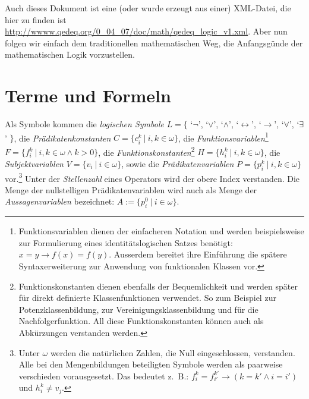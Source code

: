 \documentclass[a4paper,german,10pt,twoside]{book}
\theoremstyle{definition}
\theoremstyle{remark}
\begin{document}
\par
Auch dieses Dokument ist eine (oder wurde erzeugt aus einer) XML-Datei, die hier zu finden ist \url{http://wwww.qedeq.org/0_04_07/doc/math/qedeq_logic_v1.xml}.
Aber nun folgen wir einfach dem traditionellen mathematischen Weg, die Anfangsg{\"u}nde der mathematischen Logik vorzustellen.

\section{Terme und Formeln} \label{chapter4_section1} \hypertarget{chapter4_section1}{}
Als Symbole kommen die \emph{logischen Symbole} $L = \{$ \mbox{`$\neg$'}, \mbox{`$\vee$'}, \mbox{`$\wedge$'},             \mbox{`$\leftrightarrow$'}, \mbox{`$\rightarrow$'}, \mbox{`$\forall$'}, \mbox{`$\exists$'} $\}$, die 
\emph{Pr{\"a}dikatenkonstanten} $C = \{c^k_i~|~i, k \in \omega\}$, die 
\emph{Funktionsvariablen}\footnote{Funktionsvariablen dienen der einfacheren Notation und werden beispielsweise zur Formulierung eines identit{\"a}tslogischen Satzes ben{\"o}tigt: $x = y \rightarrow f(x) = f(y)$. Ausserdem bereitet ihre Einf{\"u}hrung die sp{\"a}tere Syntaxerweiterung zur Anwendung von funktionalen Klassen vor.} $F = \{f^k_i~|~i, k \in \omega \land k > 0\}$, die \emph{Funktionskonstanten}\footnote{Funktionskonstanten dienen ebenfalls der Bequemlichkeit und werden sp{\"a}ter f{\"u}r direkt 
definierte Klassenfunktionen verwendet. So zum Beispiel zur Potenzklassenbildung, zur Vereinigungsklassenbildung und f{\"u}r die
Nachfolgerfunktion. All diese Funktionskonstanten k{\"o}nnen auch als Abk{\"u}rzungen verstanden werden.}
$H = \{h^k_i~|~i, k \in \omega\}$, die \emph{Subjektvariablen} 
$V = \{v_i~|~i \in \omega\}$, sowie die \emph{Pr{\"a}dikatenvariablen}
$P = \{p^k_i~|~i, k \in \omega\}$ vor.\footnote{Unter $\omega$ werden die nat{\"u}rlichen Zahlen, die Null eingeschlossen, verstanden. Alle bei den Mengenbildungen beteiligten Symbole werden als paarweise verschieden vorausgesetzt. Das bedeutet z.~B.: $f^k_i = f^{k'}_{i'} \rightarrow (k = k' \land i = i')$ und $h^k_i \neq v_j$.} Unter der \emph{Stellenzahl} eines Operators wird der obere Index verstanden. Die Menge der nullstelligen Pr{\"a}dikatenvariablen wird auch als Menge der
\emph{Aussagenvariablen} bezeichnet: $A := \{p_i^0~|~i \in \omega \}$. 
\end{document}
